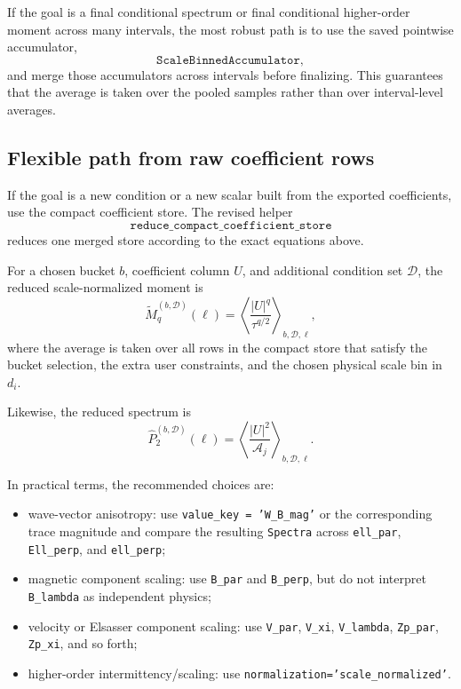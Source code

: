 \documentclass[11pt]{article}
\begin{document}
If the goal is a final conditional spectrum or final conditional higher-order moment across many intervals, the most robust path is to use the saved pointwise accumulator,
\begin{equation}
 \texttt{ScaleBinnedAccumulator},
\end{equation}
and merge those accumulators across intervals before finalizing. This guarantees that the average is taken over the pooled samples rather than over interval-level averages.

\subsection{Flexible path from raw coefficient rows}

If the goal is a new condition or a new scalar built from the exported coefficients, use the compact coefficient store. The revised helper
\begin{equation}
 \texttt{reduce\_compact\_coefficient\_store}
\end{equation}
reduces one merged store according to the exact equations above.

For a chosen bucket $b$, coefficient column $U$, and additional condition set $\mathcal D$, the reduced scale-normalized moment is
\begin{equation}
 \widetilde{M}_q^{(b,\mathcal D)}(\ell) = \left\langle \frac{|U|^q}{\tau^{q/2}} \right\rangle_{b,\mathcal D,\ell},
\end{equation}
where the average is taken over all rows in the compact store that satisfy the bucket selection, the extra user constraints, and the chosen physical scale bin in $d_i$.

Likewise, the reduced spectrum is
\begin{equation}
 \widehat{P}_2^{(b,\mathcal D)}(\ell) = \left\langle \frac{|U|^2}{\mathcal A_j} \right\rangle_{b,\mathcal D,\ell}.
\end{equation}

In practical terms, the recommended choices are:
\begin{itemize}[leftmargin=1.5em]
    \item wave-vector anisotropy: use \texttt{value\_key = 'W\_B\_mag'} or the corresponding trace magnitude and compare the resulting \texttt{Spectra} across \texttt{ell\_par}, \texttt{Ell\_perp}, and \texttt{ell\_perp};
    \item magnetic component scaling: use \texttt{B\_par} and \texttt{B\_perp}, but do not interpret \texttt{B\_lambda} as independent physics;
    \item velocity or Elsasser component scaling: use \texttt{V\_par}, \texttt{V\_xi}, \texttt{V\_lambda}, \texttt{Zp\_par}, \texttt{Zp\_xi}, and so forth;
    \item higher-order intermittency/scaling: use \texttt{normalization='scale\_normalized'}.
\end{itemize}
\end{document}
